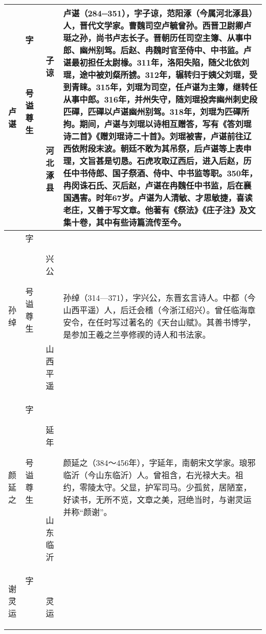 \begin{longtable}{|>{\centering\namefont\heiti}m{2em}|>{\centering\tiny}m{3.0em}|>{\xzfont\kaiti}m{7.3em}|}
  卢谌 & \begin{description}
  \item[字] 子谅
  \item[号] 
  \item[谥] 
  \item[尊] 
  \item[生] 河北涿县
  \end{description} & 卢谌（284─351），字子谅，范阳涿（今属河北涿县）人，晋代文学家。曹魏司空卢毓曾孙。西晋卫尉卿卢珽之孙，尚书卢志长子。晋朝历任司空主簿、从事中郎、幽州别驾。后赵、冉魏时官至侍中、中书监。卢谌最初担任太尉椽。311年，洛阳失陷，随父北依刘琨，途中被刘粲所掳。312年，辗转归于姨父刘琨，受到青睐。315年，刘琨为司空，任卢谌为主簿，继转任从事中郎。316年，并州失守，随刘琨投奔幽州刺史段匹磾，匹磾以卢谌幽州别驾。318年，刘琨为匹磾所拘。期间，卢谌与刘琨以诗相互赠答，写有《答刘琨诗二首》《赠刘琨诗二十首》。刘琨被害，卢谌前往辽西依附段末波。朝廷不敢为其吊祭，后卢谌等上表申理，文旨甚是切恳。石虎攻取辽西后，进入后赵，历任中书侍郎、国子祭酒、侍中、中书监等职。350年，冉闵诛石氏、灭后赵，卢谌在冉魏任中书监，后在襄国遇害。时年67岁。卢谌为人清敏、才思敏捷，喜读老庄，又善于写文章。他著有《祭法》《庄子注》及文集十卷，其中有些诗篇流传至今。 \tabularnewline\hline
  孙绰 & \begin{description}
  \item[字] 兴公
  \item[号] 
  \item[谥] 
  \item[尊] 
  \item[生] 山西平遥
  \end{description} & 孙绰（314—371），字兴公，东晋玄言诗人。中都（今山西平遥）人，后迁会稽（今浙江绍兴）。曾任临海章安令，在任时写过著名的《天台山赋》。其善书博学，是参加王羲之兰亭修禊的诗人和书法家。 \tabularnewline\hline
    颜延之 & \begin{description}
    \item[字] 延年
    \item[号] 
    \item[谥] 
    \item[尊] 
    \item[生] 山东临沂
    \end{description} & 颜延之（384～456年），字延年，南朝宋文学家。琅邪临沂（今山东临沂）人。曾祖含，右光禄大夫。祖约，零陵太守。父显，护军司马。少孤贫，居陋室，好读书，无所不览，文章之美，冠绝当时，与谢灵运并称“颜谢”。 \tabularnewline\hline
    谢灵运 & \begin{description}
    \item[字] 灵运

\end{description}
\end{longtable}
